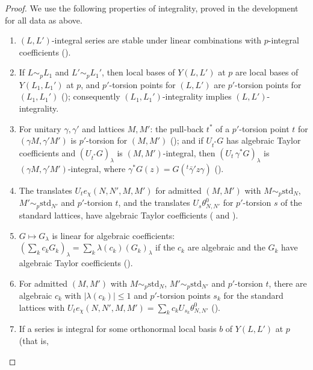 \begin{proof}
We use the following properties of integrality, proved in the development for all data as above.
\begin{enumerate}[label=(I\arabic*)]
\item\label{pf:reckernel:I1} $(L,L')$-integral series are stable under linear combinations with $p$-integral coefficients
  ().
\item\label{pf:reckernel:I2} If $L\sim_pL_1$ and $L'\sim_pL_1'$, then local bases of $Y(L,L')$ at $p$ are local bases of
  $Y(L_1,L_1')$ at $p$, and $p'$-torsion points for $(L,L')$ are $p'$-torsion points for $(L_1,L_1')$
  (); consequently $(L_1,L_1')$-integrality implies $(L,L')$-integrality.
\item\label{pf:reckernel:I3} For unitary $\gamma,\gamma'$ and lattices $M,M'$: the pull-back $t^*$ of a $p'$-torsion point $t$
  for $(\gamma M,\gamma'M')$ is $p'$-torsion for $(M,M')$ (); and if
  $U_{t^*}G$ has algebraic Taylor coefficients and $(U_{t^*}G)_\lambda$ is $(M,M')$-integral, then
  $(U_t\,\gamma^*G)_\lambda$ is $(\gamma M,\gamma'M')$-integral, where $\gamma^*G(z)=G({}^t\bar\gamma'z\gamma)$
  ().
\item\label{pf:reckernel:I4} The translates $U_te_\chi(N,N',M,M')$ for admitted $(M,M')$ with $M\sim_p\mathrm{std}_N$,
  $M'\sim_p\mathrm{std}_{N'}$ and $p'$-torsion $t$, and the translates $U_s\theta^0_{N,N'}$ for $p'$-torsion $s$ of the
  standard lattices, have algebraic Taylor coefficients ( and ).
\item\label{pf:reckernel:I5} $G\mapsto G_\lambda$ is linear for algebraic coefficients:
  $(\sum_kc_kG_k)_\lambda=\sum_k\lambda(c_k)(G_k)_\lambda$ if the $c_k$ are algebraic and the $G_k$ have algebraic Taylor
  coefficients ().
\item\label{pf:reckernel:I6} For admitted $(M,M')$ with $M\sim_p\mathrm{std}_N$, $M'\sim_p\mathrm{std}_{N'}$ and $p'$-torsion
  $t$, there are algebraic $c_k$ with $|\lambda(c_k)|\le1$ and $p'$-torsion points $s_k$ for the standard lattices with
  $U_te_\chi(N,N',M,M')=\sum_kc_kU_{s_k}\theta^0_{N,N'}$ ().
\item\label{pf:reckernel:I7} If a series is integral for some orthonormal local basis $b$ of $Y(L,L')$ at $p$ (that is,

\end{enumerate}
\end{proof}
